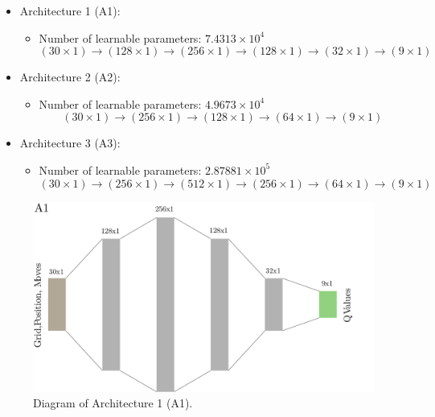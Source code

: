 \documentclass[
  openany]{book}
\providecommand{\tightlist}{%
  \setlength{\itemsep}{0pt}\setlength{\parskip}{0pt}}
\begin{document}
\begin{itemize}
\tightlist
\item
  Architecture 1 (A1):

  \begin{itemize}
  \tightlist
  \item
    Number of learnable parameters: \ensuremath{7.4313\times 10^{4}}
    \[(30 \times 1) \to (128 \times 1) \to (256 \times 1) \to (128 \times 1) \to (32 \times 1) \to (9 \times 1)\]
  \end{itemize}
\item
  Architecture 2 (A2):

  \begin{itemize}
  \tightlist
  \item
    Number of learnable parameters: \ensuremath{4.9673\times 10^{4}}
    \[(30 \times 1) \to (256 \times 1) \to (128 \times 1) \to (64 \times 1) \to (9 \times 1)\]
  \end{itemize}
\item
  Architecture 3 (A3):

  \begin{itemize}
  \tightlist
  \item
    Number of learnable parameters: \ensuremath{2.87881\times 10^{5}}
    \[(30 \times 1) \to (256 \times 1) \to (512 \times 1) \to (256 \times 1) \to (64 \times 1) \to (9 \times 1)\]
  \end{itemize}
\end{itemize}



\begin{figure}

{\centering \includegraphics[width=0.8\linewidth]{pics/A1} 

}

\caption{Diagram of Architecture 1 (A1).}\label{fig:A1}
\end{figure}
\end{document}
